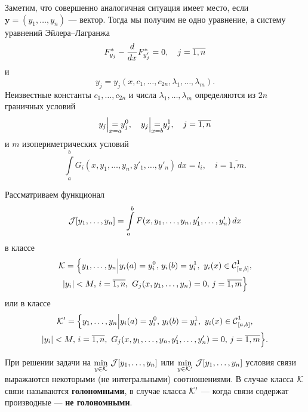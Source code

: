 \begin{enumerateD}
	Заметим, что совершенно аналогичная ситуация имеет место, если $\bm{y}=(y_1,\ldots,y_n)$ --- вектор. Тогда мы получим не одно уравнение, а систему уравнений Эйлера--Лагранжа
	\begin{equation*}
		 F^{\ast}_{y_j}-\frac{d}{dx}F^{\ast}_{y'_j}=0,\quad j=\overline{1,n}
	\end{equation*}
	и
	\begin{equation*}	
		y_j=y_j(x,c_1,\ldots,c_{2n},\lambda_1,\ldots,\lambda_m).
	\end{equation*}
	Неизвестные константы $c_1,\ldots,c_{2n}$ и числа $\lambda_1,\ldots,\lambda_m$ определяются из $2n$ граничных условий
	\begin{equation*}
		 y_j\Big|_{\lefteqn{\scriptstyle x=a}}=y_j^0,\quad y_j\Big|_{\lefteqn{\scriptstyle x=b}}=y_j^1,\quad j=\overline{1,n}
	\end{equation*}
	и $m$ изопериметрических условий
	\begin{equation*}
		 \int\limits_a^b G_i(x,y_1,\ldots,y_n,y'_1,\ldots,y'_n)\,dx=l_i,\quad i=\overline{1,m}.
	\end{equation*}
	\item Рассматриваем функционал 
	\begin{equation*}
		\mathcal{J}[y_1,\ldots,y_n]=\int\limits_a^b F(x,y_1,\ldots,y_n,y'_1,\ldots,y'_n)\,dx
	\end{equation*}
	в классе 
	\begin{multline*}
		\K=\Big\{y_1,\ldots,y_n\Big|y_i(a)=y_i^0,\,y_i(b)=y_i^1,\ y_i(x)\in\Cfn[{[a,b]}]{1},\\ |y_i|<M,\,i=\overline{1,n},\  G_j(x,y_1,\ldots,y_n)=0,\,j=\overline{1,m}\Big\}
	\end{multline*}
	или в классе
	\begin{multline*}
		\K'=\Big\{y_1,\ldots,y_n\Big|y_i(a)=y_i^0,\,y_i(b)=y_i^1,\ y_i(x)\in\Cfn[{[a,b]}]{1},\\ |y_i|<M,\,i=\overline{1,n},\  G_j(x,y_1,\ldots,y_n,y'_1,\ldots,y'_n)=0,\,j=\overline{1,m}\Big\}.
	\end{multline*}
	
	При решении задачи на $\min\limits_{y\in\mathcal{K}}\,\mathcal{J}[y_1,\ldots,y_n]$ или $\min\limits_{y\in\mathcal{K}'}\,\mathcal{J}[y_1,\ldots,y_n]$ условия связи выражаются некоторыми (не интегральными) соотношениями. В случае класса $\mathcal{K}$ связи называются \textbf{голономными}, в случае класса $\mathcal{K}'$ --- когда связи содержат производные --- \textbf{не голономными}.
	

\end{enumerateD}
